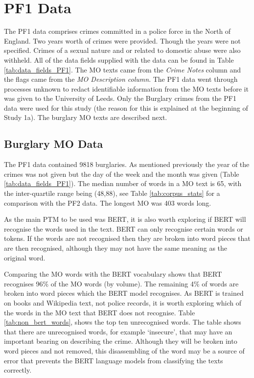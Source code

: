 \section{PF1 Data} The PF1 data comprises crimes committed in a police force in the North of England. Two years worth of crimes were provided. Though the years were not specified. Crimes of a sexual nature and or related to domestic abuse were also withheld. All of the data fields supplied with the data can be found in Table \ref{tab:data_fields_PF1}. The MO texts came from the \emph{Crime Notes} column and the flags came from the \emph{MO Description column}. The PF1 data went through processes unknown to redact identifiable information from the MO texts before it was given to the University of Leeds. Only the Burglary crimes from the PF1 data were used for this study (the reason for this is explained at the beginning of Study 1a). The burglary MO texts are described next.

\subsection{Burglary MO Data} The PF1 data contained 9818 burglaries. As mentioned previously the year of the crimes was not given but the day of the week and the month was given (Table \ref{tab:data_fields_PF1}). The median number of words in a MO text is 65, with the inter-quartile range being (48,88), see Table \ref{tab:corpus_stats} for a comparison with the PF2 data. The longest MO was 403 words long.


As the main PTM to be used was BERT, it is also worth exploring if BERT will recognise the words used in the text. BERT can only recognise certain words or tokens. If the words are not recognised then they are broken into word pieces that are then recognised, although they may not have the same meaning as the original word. 

Comparing the MO words with the BERT vocabulary shows that BERT recognises 96\% of the MO words (by volume). The remaining 4\% of words are broken into word pieces which the BERT model recognises. As BERT is trained on books and Wikipedia text, not police records, it is worth exploring which of the words in the MO text that BERT does not recognise. Table \ref{tab:non_bert_words}, shows the top ten unrecognised words. The table shows that there are unrecognised words, for example ‘insecure’, that may have an important bearing on describing the crime. Although they will be broken into word pieces and not removed, this disassembling of the word may be a source of error that prevents the BERT language models from classifying the texts correctly.



